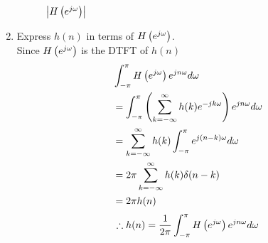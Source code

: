 \documentclass[journal,12pt,twocolumn]{IEEEtran}
\renewcommand\thesection{\arabic{section}}
\begin{document}
\begin{enumerate}[label=\thesection.\arabic*]
\begin{figure}[!ht]
\caption{$\left\vert H\left(e^{j\omega}\right)\right\vert$}
\label{fig:dtft}
\end{figure}
\item Express $h(n)$ in terms of $H\left(e^{j \omega}\right)$.\\
\solution Since $H\left(e^{j \omega}\right)$ is the DTFT of $h(n)$
\begin{align}
  &\int_{-\pi}^{\pi} H\left(e^{j\omega}\right) e^{jn\omega} d\omega\\
  &=\int_{-\pi}^{\pi} \left(\sum_{k=-\infty}^{\infty} h(k) e^{-jk\omega}\right) e^{jn\omega} d\omega\\
  &=\sum_{k=-\infty}^{\infty} h(k) \int_{-\pi}^{\pi}  e^{j(n-k)\omega} d\omega\\
  &=2\pi \sum_{k=-\infty}^{\infty} h(k) \delta(n-k)\\
  &=2\pi h(n)
\end{align}
\begin{equation}
  \therefore h(n) = \frac{1}{2\pi} \int_{-\pi}^{\pi} H\left(e^{j\omega}\right) e^{jn\omega} d\omega
\end{equation}
\end{enumerate}
\end{document}
